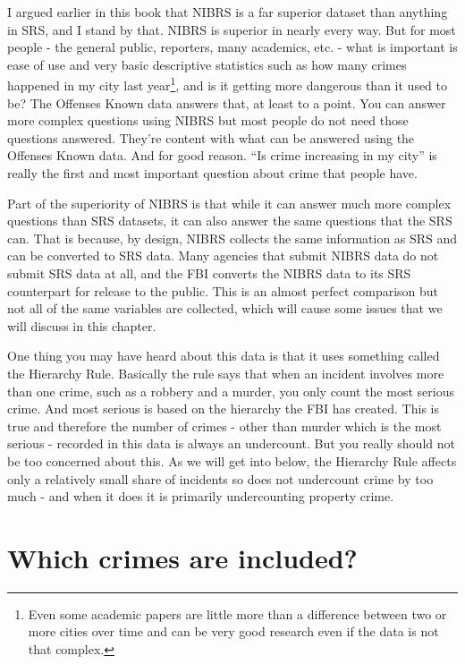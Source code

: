 \documentclass[
]{krantz}
\begin{document}
I argued earlier in this book that NIBRS is a far superior
dataset than anything in SRS, and I stand by that. NIBRS is
superior in nearly every way. But for most people - the
general public, reporters, many academics, etc. - what is
important is ease of use and very basic descriptive
statistics such as how many crimes happened in my city last
year\footnote{Even some academic papers are little more than
  a difference between two or more cities over time and can
  be very good research even if the data is not that
  complex.}, and is it getting more dangerous than it used
to be? The Offenses Known data answers that, at least to a
point. You can answer more complex questions using NIBRS but
most people do not need those questions answered. They're
content with what can be answered using the Offenses Known
data. And for good reason. ``Is crime increasing in my
city'' is really the first and most important question about
crime that people have.

Part of the superiority of NIBRS is that while it can answer
much more complex questions than SRS datasets, it can also
answer the same questions that the SRS can. That is because,
by design, NIBRS collects the same information as SRS and
can be converted to SRS data. Many agencies that submit
NIBRS data do not submit SRS data at all, and the FBI
converts the NIBRS data to its SRS counterpart for release
to the public. This is an almost perfect comparison but not
all of the same variables are collected, which will cause
some issues that we will discuss in this chapter.

One thing you may have heard about this data is that it uses
something called the Hierarchy Rule. Basically the rule says
that when an incident involves more than one crime, such as
a robbery and a murder, you only count the most serious
crime. And most serious is based on the hierarchy the FBI
has created. This is true and therefore the number of crimes
- other than murder which is the most serious - recorded in
this data is always an undercount. But you really should not
be too concerned about this. As we will get into below, the
Hierarchy Rule affects only a relatively small share of
incidents so does not undercount crime by too much - and
when it does it is primarily undercounting property crime.

\section{Which crimes are
included?}\label{indexCrimesOffensesKnown}
\end{document}
